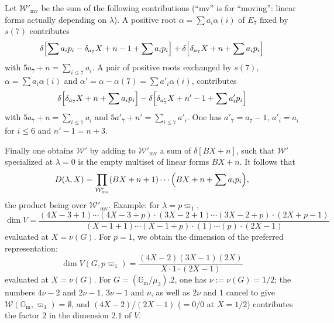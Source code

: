 \documentclass[11pt,a4paper]{article}
\begin{document}
Let $\mathcal{W}'_{\mathrm{mv}}$ be the sum of the following contributions (``mv'' is for ``moving'': linear forms actually depending on $\lambda$). A positive root $\alpha = \sum a_{i}\alpha(i)$ of $E_{7}$ fixed by $s(7)$ contributes
\begin{equation*}
\delta\Bigl[\sum a_{i}p_{i} - \delta_{a_{7}}X + n - 1 + \sum a_{i}p_{i}\Bigr] + \delta\Bigl[\delta_{a_{7}}X + n + \sum a_{i}p_{i}\Bigr]
\end{equation*}
with $5a_{7} + n = \sum_{i \leqslant 7} a_{i}$. A pair of positive roots exchanged by $s(7)$, $\alpha = \sum a_{i}\alpha(i)$ and $\alpha' = \alpha - \alpha(7) = \sum a'_{i}\alpha(i)$, contributes
\begin{equation*}
\delta\Bigl[\delta_{a_{7}}X + n + \sum a_{i}p_{i}\Bigr] - \delta\Bigl[\delta_{a'_{7}}X + n' - 1 + \sum a'_{i}p_{i}\Bigr]
\end{equation*}
with $5a_{7} + n = \sum_{i \leqslant 7} a_{i}$ and $5a'_{7} + n' = \sum_{i \leqslant 7} a'_{i}$. One has $a'_{7} = a_{7} - 1$, $a'_{i} = a_{i}$ for $i \leqslant 6$ and $n' - 1 = n + 3$.

Finally one obtains $\mathcal{W}'$ by adding to $\mathcal{W}'_{\mathrm{mv}}$ a sum of $\delta[BX + n]$, such that $\mathcal{W}'$ specialized at $\lambda = 0$ is the empty multiset of linear forms $BX + n$. It follows that
\begin{equation*}
D(\lambda, X) = \prod_{\mathcal{W}'_{\mathrm{mv}}} (BX + n + 1) \cdots \Bigl(BX + n + \sum a_{i}p_{i}\Bigr),
\end{equation*}
the product being over $\mathcal{W}'_{\mathrm{mv}}$. Example: for $\lambda = p\varpi_{1}$,
\begin{equation*}
\dim V = \frac{(4X - 3 + 1) \cdots (4X - 3 + p) \cdot (3X - 2 + 1) \cdots (3X - 2 + p) \cdot (2X + p - 1)}{(X - 1 + 1) \cdots (X - 1 + p) \cdot (1) \cdots (p) \cdot (2X - 1)}
\end{equation*}
evaluated at $X = \nu(G)$. For $p = 1$, we obtain the dimension of the preferred representation:
\begin{equation*}
\dim V(G, p\varpi_{1}) = \frac{(4X - 2)(3X - 1)(2X)}{X \cdot 1 \cdot (2X - 1)}
\end{equation*}
evaluated at $X = \nu(G)$. For $G = (\mathbb{G}_{\mathrm{m}}/\mu_{3}).2$, one has $\nu := \nu(G) = 1/2$; the numbers $4\nu - 2$ and $2\nu - 1$, $3\nu - 1$ and $\nu$, as well as $2\nu$ and $1$ cancel to give $\mathcal{W}(\mathbb{G}_{\mathrm{m}}, \varpi_{1}) = \emptyset$, and $(4X - 2)/(2X - 1)$ ($= 0/0$ at $X = 1/2$) contributes the factor $2$ in the dimension $2.1$ of $V$.
\end{document}
